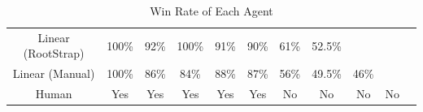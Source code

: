 \documentclass[a4paper,12pt,table]{article}
\begin{document}
\begin{table}[H]
{\begin{tabular}{|c|cccccccccc}
    Linear (RootStrap) & \multicolumn{1}{c|}{100\%}                    & \multicolumn{1}{c|}{92\%}                       & \multicolumn{1}{c|}{100\%}                      & \multicolumn{1}{c|}{91\%}                       & \multicolumn{1}{c|}{90\%}                       & \multicolumn{1}{c|}{61\%}                           & \multicolumn{1}{c|}{52.5\%}                           & \cellcolor[HTML]{000000}                        & \cellcolor[HTML]{000000}                        & \cellcolor[HTML]{000000}                        \\ \cline{1-9}
    Linear (Manual) & \multicolumn{1}{c|}{100\%}                       & \multicolumn{1}{c|}{86\%}                        & \multicolumn{1}{c|}{84\%}                      & \multicolumn{1}{c|}{88\%}                       & \multicolumn{1}{c|}{87\%}                       & \multicolumn{1}{c|}{56\%}                           & \multicolumn{1}{c|}{49.5\%}                     & \multicolumn{1}{c|}{46\%}                        & \cellcolor[HTML]{000000}                        & \cellcolor[HTML]{000000}                        \\ \cline{1-10}
    Human          & \multicolumn{1}{c|}{Yes}                      & \multicolumn{1}{c|}{Yes}                      & \multicolumn{1}{c|}{Yes}                           & \multicolumn{1}{c|}{Yes}                      & \multicolumn{1}{c|}{Yes}                           & \multicolumn{1}{c|}{No}                           & \multicolumn{1}{c|}{No}                           & \multicolumn{1}{c|}{No}                           & \multicolumn{1}{c|}{No}                           & \cellcolor[HTML]{000000}                        \\ \cline{1-10}
    \end{tabular}
    }
    \caption{Win Rate of Each Agent}
    \label{table:}
\end{table}
\end{document}
